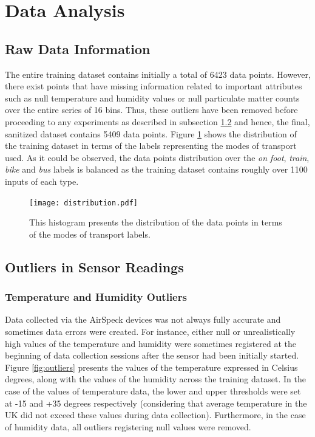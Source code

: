 \documentclass[bsc,frontabs,twoside,singlespacing,parskip,deptreport]{infthesis}     %
\begin{document}
\section{Data Analysis}
\label{sec:data-analysis}

\subsection{Raw Data Information}

The entire training dataset contains initially a total of 6423 data points. However, there exist points that have missing information related to important attributes such as null temperature and humidity values or null particulate matter counts over the entire series of 16 bins. Thus, these outliers have been removed before proceeding to any experiments as described in subsection \ref{subsec:outlier-removal} and hence, the final, sanitized dataset contains 5409 data points. Figure \ref{fig:distribution} shows the distribution of the training dataset in terms of the labels representing the modes of transport used. As it could be observed, the data points distribution over the \textit{on foot}, \textit{train}, \textit{bike} and \textit{bus} labels is balanced as the training dataset contains roughly over 1100 inputs of each type.

\begin{figure}[h!]
  \center
  \texttt{[image: distribution.pdf]}
  \caption{This histogram presents the distribution of the data points in terms of the modes of transport labels.}
  \label{fig:distribution}
\end{figure}


\subsection{Outliers in Sensor Readings}
\label{subsec:outlier-removal}

\subsubsection*{Temperature and Humidity Outliers}

Data collected via the AirSpeck devices was not always fully accurate and sometimes data errors were created. For instance, either null or unrealistically high values of the temperature and humidity were sometimes registered at the beginning of data collection sessions after the sensor had been initially started. Figure \ref{fig:outliers} presents the values of the temperature expressed in Celsius degrees, along with the values of the humidity across the training dataset. In the case of the values of temperature data, the lower and upper thresholds were set at -15 and +35 degrees respectively (considering that average temperature in the UK did not exceed these values during data collection). Furthermore, in the case of humidity data, all outliers registering null values were removed.
\end{document}
